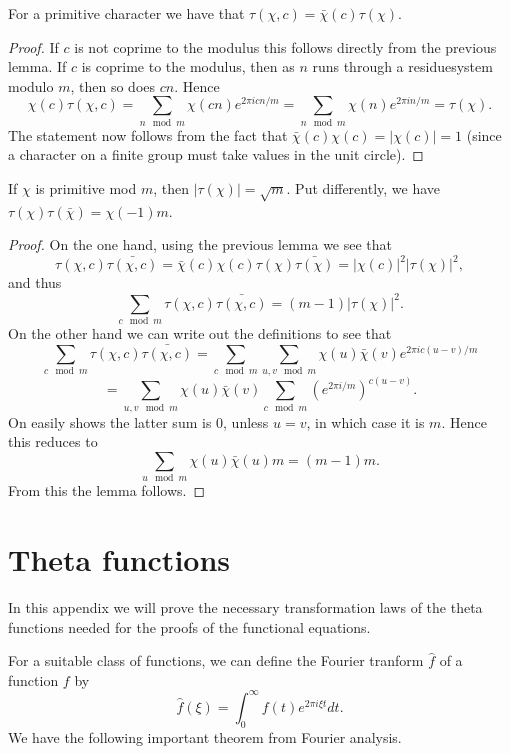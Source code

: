 \documentclass{amsart}
\begin{document}
\begin{lemma}
  \label{lem:chia}
  For a primitive character we have that $\tau(\chi,c) = \bar\chi(c)\tau(\chi)$.
\end{lemma}


\begin{proof}
  If $c$ is not coprime to the modulus this follows directly from the previous lemma. If $c$ is coprime to the modulus, then as $n$ runs through a residuesystem modulo $m$, then so does $cn$. Hence
  \[\chi(c)\tau(\chi,c) = \sum_{n\mod m} \chi(cn) e^{2\pi i cn/m} = \sum_{n\mod m} \chi(n) e^{2\pi i n/m} = \tau(\chi). \]
  The statement now follows from the fact that $\bar\chi(c)\chi(c) = |\chi(c)| = 1$ (since a character on a finite group must take values in the unit circle).
\end{proof}

\begin{lemma}
  \label{lem:gsums}
  If $\chi$ is primitive mod $m$, then $|\tau(\chi)| = \sqrt{m}$. Put differently, we have $\tau(\chi)\tau(\bar\chi) = \chi(-1)m$.
\end{lemma}

\begin{proof}
  On the one hand, using the previous lemma we see that
  \[\tau(\chi,c)\bar{\tau(\chi,c)} = \bar\chi(c)\chi(c)\tau(\chi)\bar{\tau(\chi)} = |\chi(c)|^2|\tau(\chi)|^2, \]
  and thus
  \[\sum_{c \mod m} \tau(\chi,c)\bar{\tau(\chi,c)} = (m-1)|\tau(\chi)|^2. \]
  On the other hand we can write out the definitions to see that
  \[\sum_{c \mod m} \tau(\chi,c)\bar{\tau(\chi,c)} = \sum_{c \mod m} \sum_{u,v \mod m} \chi(u)\bar\chi(v)e^{2\pi i c(u-v)/m}\]\[= \sum_{u,v\mod m} \chi(u)\bar\chi(v) \sum_{c \mod m} \left( e^{2\pi i/m} \right)^{c(u-v)}.\]
  On easily shows the latter sum is $0$, unless $u=v$, in which case it is $m$. Hence this reduces to
  \[\sum_{u\mod m} \chi(u)\bar\chi(u)m = (m-1)m. \]
  From this the lemma follows.
\end{proof}


\section{Theta functions}
\label{app:psf}
In this appendix we will prove the necessary transformation laws of the theta functions needed for the proofs of the functional equations.

For a suitable class of functions, we can define the Fourier tranform $\hat f$ of a function $f$ by
\[\hat f(\xi) = \int_0^\infty f(t) e^{2\pi i \xi t} dt. \]
We have the following important theorem from Fourier analysis.
\end{document}
